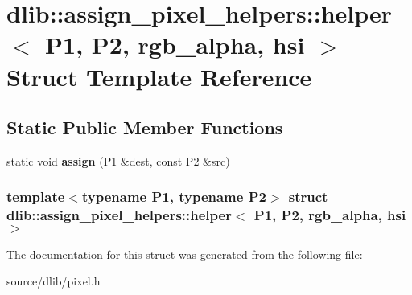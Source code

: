 \hypertarget{structdlib_1_1assign__pixel__helpers_1_1helper_3_01P1_00_01P2_00_01rgb__alpha_00_01hsi_01_4}{
\section{dlib::assign\_\-pixel\_\-helpers::helper$<$ P1, P2, rgb\_\-alpha, hsi $>$ Struct Template Reference}
\label{structdlib_1_1assign__pixel__helpers_1_1helper_3_01P1_00_01P2_00_01rgb__alpha_00_01hsi_01_4}
}
\subsection*{Static Public Member Functions}
\begin{DoxyCompactItemize}
\item 
\hypertarget{structdlib_1_1assign__pixel__helpers_1_1helper_3_01P1_00_01P2_00_01rgb__alpha_00_01hsi_01_4_ac758e8f4e4bc79c10db8cec86658f495}{
static void {\bfseries assign} (P1 \&dest, const P2 \&src)}
\label{structdlib_1_1assign__pixel__helpers_1_1helper_3_01P1_00_01P2_00_01rgb__alpha_00_01hsi_01_4_ac758e8f4e4bc79c10db8cec86658f495}

\end{DoxyCompactItemize}
\subsubsection*{template$<$typename P1, typename P2$>$ struct dlib::assign\_\-pixel\_\-helpers::helper$<$ P1, P2, rgb\_\-alpha, hsi $>$}



The documentation for this struct was generated from the following file:\begin{DoxyCompactItemize}
\item 
source/dlib/pixel.h\end{DoxyCompactItemize}
